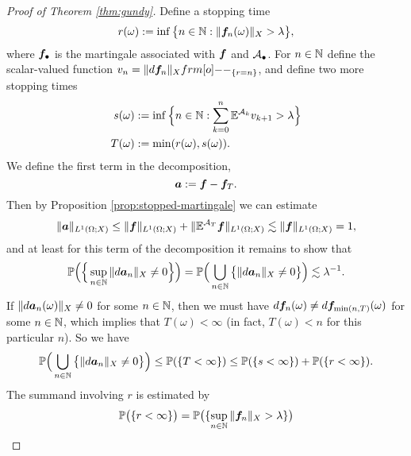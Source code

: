 \begin{proof}[Proof of Theorem \ref{thm:gundy}]
  Define a stopping time
  \begin{equation*}
    r(\omega) := \inf\big\{ n \in \mathbb{N} : \|\bm{f}_{n}(\omega)\|_{X} > \lambda \big\},
  \end{equation*}
  where $\bm{f}_{\bullet}$ is the martingale associated with $\bm{f}$ and $\mathcal{A}_{\bullet}$.
  For $n \in \mathbb{N}$ define the scalar-valued function $v_{n} = \|d\mb{f}_{n}\|_{X} \1_{\{r = n\}}$, and define two more stopping times
  \begin{equation*}
    \begin{aligned}
      s(\omega) &:= \inf\Big\{ n \in \mathbb{N} : \sum_{k=0}^{n} \mathbb{E}^{\mathcal{A}_{k}} v_{k+1} > \lambda \Big\} \\
      T(\omega) &:= \min(r(\omega), s(\omega)).
    \end{aligned}
  \end{equation*}
  We define the first term in the decomposition,
  \begin{equation*}
    \bm{a} := \bm{f} - \bm{f}_{T}.
  \end{equation*}
  Then by Proposition \ref{prop:stopped-martingale} we can estimate
  \begin{equation}\label{eq:a-1stest}
    \|\bm{a}\|_{L^1(\Omega;X)} \leq \|\bm{f}\|_{L^1(\Omega;X)} + \|\mathbb{E}^{\mathcal{A}_{T}}\bm{f}\|_{L^1(\Omega;X)}
    \lesssim \|\bm{f}\|_{L^1(\Omega;X)} = 1,
  \end{equation}
  and at least for this term of the decomposition it remains to show that
  \begin{equation}\label{eq:a-2ndest}
    \mathbb{P}\Big(\Big\{\sup_{n \in \mathbb{N}} \|d\bm{a}_{n}\|_{X} \neq 0\Big\}\Big) = \mathbb{P}\Big(\bigcup_{n \in \mathbb{N}} \big\{\|d\bm{a}_{n}\|_{X} \neq 0\big\}\Big) \lesssim \lambda^{-1}.
  \end{equation}
  If $\|d\bm{a}_{n}(\omega)\|_{X} \neq 0$ for some $n \in \mathbb{N}$, then we must have $d\bm{f}_{n}(\omega) \neq d\bm{f}_{\min(n,T)}(\omega)$ for some $n \in \mathbb{N}$, which implies that $T(\omega) < \infty$ (in fact, $T(\omega) < n$ for this particular $n$).
  So we have
  \begin{equation*}
    \mathbb{P}\Big(\bigcup_{n \in \mathbb{N}} \big\{\|d\bm{a}_{n}\|_{X} \neq 0\big\}\Big) \leq \mathbb{P}(\{T < \infty\}) \leq \mathbb{P}(\{s < \infty\}) + \mathbb{P}(\{r < \infty\}).
  \end{equation*}
  The summand involving $r$ is estimated by
  \begin{equation}\label{eq:a-rest}
    \P\big(\{r < \infty\}\big) = \P\big( \{\sup_{n \in \N} \|\mb{f}_{n}\|_{X} > \lambda \} \big)

\end{equation}
\end{proof}
